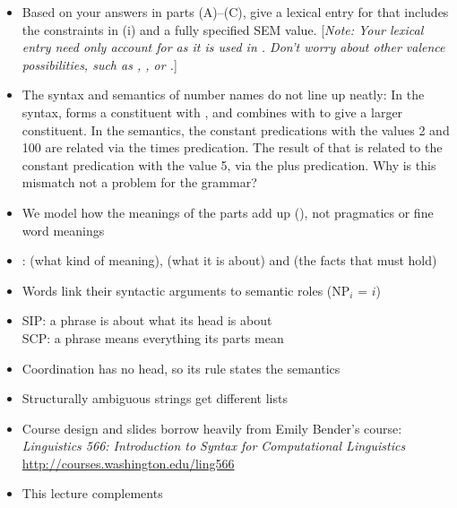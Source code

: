 \documentclass[a4paper,landscape,headrule,footrule]{foils}
\begin{document}
\begin{itemize}
\item[D.] Based on your answers in parts (A)--(C),
give a lexical entry for  that includes
the constraints in (i) and a fully specified SEM value.
[{\sl Note: Your lexical entry need only account for 
as it is used in . Don't worry about other
valence possibilities, such as
, , or .}]
\item[E.] The syntax and semantics of number names do
not line up neatly: In the syntax,  forms a constituent
with , and  combines with  to
give a larger constituent.  In the semantics, the constant
predications
with the values 2 and 100 are related via the times
predication.
The result of that is related to the constant
predication
with the value
5, via the plus
predication.
Why is this mismatch not a problem for the grammar?
\end{itemize}

\begin{itemize}
\item We model how the meanings of the parts add up
  (), not pragmatics or fine word meanings
\item {}:  (what kind of meaning),  (what it
  is about) and  (the facts that must hold)
\item Words link their syntactic arguments to semantic roles
  (NP$_i$ =  $i$)
\item SIP: a phrase is about what its head is about \\
  SCP: a phrase means everything its parts mean
\item Coordination has no head, so its rule states the semantics
\item Structurally ambiguous strings get different  lists
\end{itemize}


\begin{itemize}
\item Course design and slides borrow heavily from Emily Bender's course:
\textit{Linguistics 566: Introduction to Syntax for Computational Linguistics}
\\ \url{http://courses.washington.edu/ling566}
\item This lecture complements \citet[Chapter 5]{sag:wasow:bender:2003}
\end{itemize}

%



\end{document}
